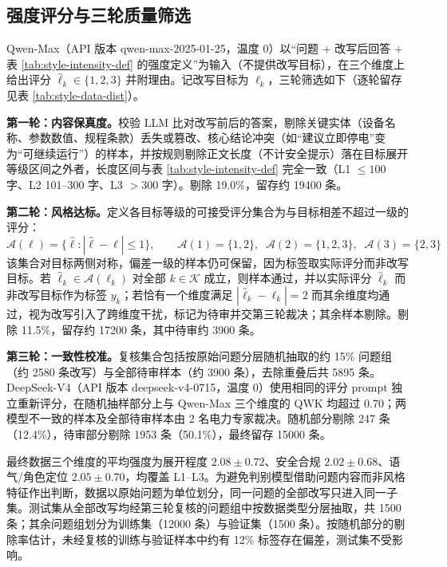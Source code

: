 \documentclass[fontset=fandol,type=master,campus=shenzhen,etitleauto=true]{hithesisbook}
\begin{document}
\subsection{强度评分与三轮质量筛选}\label{ux4e09ux8f6eux8d28ux91cfux7b5bux9009}

Qwen-Max（API 版本 qwen-max-2025-01-25，温度 0）以“问题 + 改写后回答 + 表 \ref{tab:style-intensity-def} 的强度定义”为输入（不提供改写目标），在三个维度上给出评分 $\hat{\ell}_k \in \{1, 2, 3\}$ 并附理由。记改写目标为 $\ell_k$，三轮筛选如下（逐轮留存见表 \ref{tab:style-data-dist}）。

\textbf{第一轮：内容保真度。}校验 LLM 比对改写前后的答案，剔除关键实体（设备名称、参数数值、规程条款）丢失或篡改、核心结论冲突（如“建议立即停电”变为“可继续运行”）的样本，并按规则剔除正文长度（不计安全提示）落在目标展开等级区间之外者，长度区间与表 \ref{tab:style-intensity-def} 完全一致（L1 $\leq 100$ 字、L2 101--300 字、L3 $> 300$ 字）。剔除 19.0\%，留存约 19400 条。

\textbf{第二轮：风格达标。}定义各目标等级的可接受评分集合为与目标相差不超过一级的评分：
\begin{equation}\label{eq:accept-level}
\mathcal{A}(\ell) = \bigl\{ \hat{\ell} : |\hat{\ell} - \ell| \le 1 \bigr\}, \qquad \mathcal{A}(1) = \{1, 2\}, \;\; \mathcal{A}(2) = \{1, 2, 3\}, \;\; \mathcal{A}(3) = \{2, 3\}
\end{equation}
该集合对目标两侧对称，偏差一级的样本仍可保留，因为标签取实际评分而非改写目标。若 $\hat{\ell}_k \in \mathcal{A}(\ell_k)$ 对全部 $k \in \mathcal{K}$ 成立，则样本通过，并以实际评分 $\hat{\ell}_k$ 而非改写目标作为标签 $y_k$；若恰有一个维度满足 $|\hat{\ell}_k - \ell_k| = 2$ 而其余维度均通过，视为改写引入了跨维度干扰，标记为待审并交第三轮裁决；其余样本剔除。剔除 11.5\%，留存约 17200 条，其中待审约 3900 条。

\textbf{第三轮：一致性校准。}复核集合包括按原始问题分层随机抽取的约 15\% 问题组（约 2580 条改写）与全部待审样本（约 3900 条），去除重叠后共 5895 条。DeepSeek-V4（API 版本 deepseek-v4-0715，温度 0）使用相同的评分 prompt 独立重新评分，在随机抽样部分上与 Qwen-Max 三个维度的 QWK 均超过 0.70；两模型不一致的样本及全部待审样本由 2 名电力专家裁决。随机部分剔除 247 条（12.4\%），待审部分剔除 1953 条（50.1\%），最终留存 15000 条。

最终数据三个维度的平均强度为展开程度 $2.08 \pm 0.72$、安全合规 $2.02 \pm 0.68$、语气/角色定位 $2.05 \pm 0.70$，均覆盖 L1--L3。为避免判别模型借助问题内容而非风格特征作出判断，数据以原始问题为单位划分，同一问题的全部改写只进入同一子集。测试集从全部改写均经第三轮复核的问题组中按数据类型分层抽取，共 1500 条；其余问题组划分为训练集（12000 条）与验证集（1500 条）。按随机部分的剔除率估计，未经复核的训练与验证样本中约有 12\% 标签存在偏差，测试集不受影响。
\end{document}
